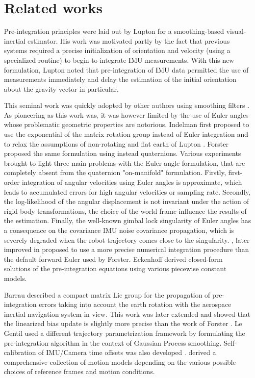 \section{Related works}

Pre-integration principles were laid out by Lupton \cite{lupton-09} for a smoothing-based visual-inertial estimator. His work was motivated partly 
by the fact that previous systems required a precise initialization of orientation and velocity (using a specialized routine) to begin to integrate IMU measurements. 
With this new formulation, Lupton noted that pre-integration of IMU data permitted the use of measurements immediately and delay the estimation of the initial 
orientation about the gravity vector in particular. 

This seminal work was quickly adopted by other authors using smoothing filters \cite{carlone2014eliminating}. As pioneering as this work was, it was however 
limited by the use of Euler angles whose problematic geometric properties are notorious. Indelman \cite{Indelman-2013-7768} first proposed to use the exponential of the 
matrix rotation group instead of Euler integration and to relax the assumptions of non-rotating and flat earth of Lupton \cite{lupton-09}. Forster \cite{forster2015imu, forster2017-TRO}
proposed the same formulation using instead quaternions. Various experiments brought to light three main problems with the Euler angle formulation, that are completely absent 
from the quaternion "on-manifold" formulation. Firstly, first-order integration of angular velocities using Euler angles is approximate, which leads to accumulated errors 
for high angular velocities or sampling rate. Secondly, the log-likelihood of the angular displacement is not invariant under the action of rigid body transformations, 
\eg the choice of the world frame influence the results of the estimation. Finally, the well-known gimbal lock singularity of Euler angles has a consequence 
on the covariance IMU noise covariance propagation, which is severely degraded when the robot trajectory comes close to the singularity. 
\cite{shen2015tightly}, later improved in \cite{qin2018vins} proposed to use a more precise numerical integration procedure than the default forward Euler used by Forster. 
Eckenhoff \cite{eckenhoff2019closed} derived closed-form solutions of the pre-integration equations using various piecewise constant models.

Barrau \cite{barrau2020mathematical} described a compact matrix Lie group for the propagation of pre-integration errors taking into account the earth rotation with the aerospace
inertial navigation system in view. This work was later extended \cite{brossard2021associating} and showed that the linearized bias update is slightly more precise than 
the work of Forster \cite{forster2017-TRO}. Le Gentil \cite{le2020gaussian} used a different trajectory parametrization framework by formulating the pre-integration algorithm 
in the context of Gaussian Process smoothing. Self-calibration of IMU/Camera time offsets was also developed \cite{yang2020analytic}. 
\cite{luo2021unified} derived a comprehensive collection of motion models depending on the various possible choices of reference frames and motion conditions. 

